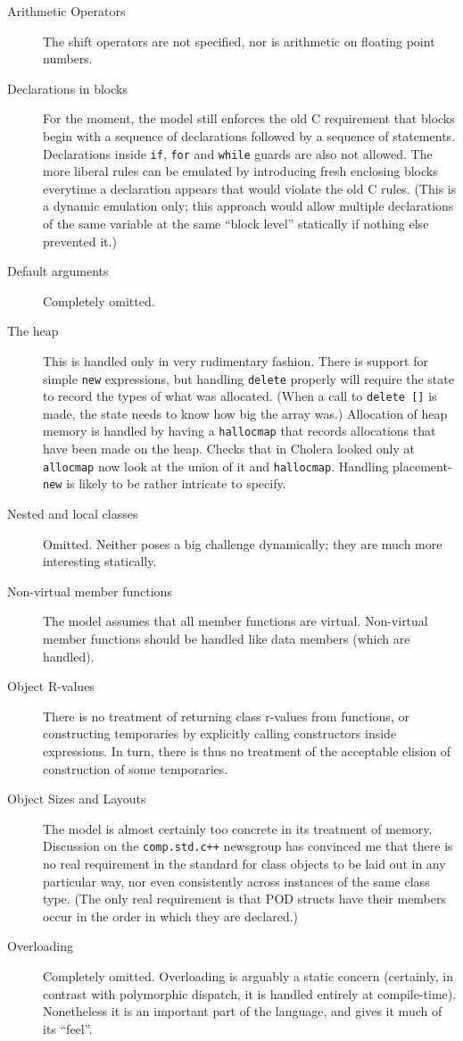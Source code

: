 \documentclass[11pt]{article}
\begin{document}
\begin{description}
\item[Arithmetic Operators]  The shift operators are not specified,
  nor is arithmetic on floating point numbers.
\item[Declarations in blocks] For the moment, the model still enforces
  the old C requirement that blocks begin with a sequence of
  declarations followed by a sequence of statements.  Declarations
  inside \texttt{if}, \texttt{for} and \texttt{while} guards are also
  not allowed.  The more liberal \cpp{} rules can be emulated by
  introducing fresh enclosing blocks everytime a declaration appears
  that would violate the old C rules.  (This is a dynamic emulation
  only; this approach would allow multiple declarations of the same
  variable at the same ``block level'' statically if nothing else
  prevented it.)
\item[Default arguments]  Completely omitted.
\item[The heap] This is handled only in very rudimentary fashion.
  There is support for simple \texttt{new} expressions, but handling
  \texttt{delete} properly will require the state to record the types
  of what was allocated.  (When a call to \texttt{delete []} is made,
  the state needs to know how big the array was.) Allocation of heap
  memory is handled by having a \texttt{hallocmap} that records
  allocations that have been made on the heap.  Checks that in
  \textsf{Cholera} looked only at \texttt{allocmap} now look at the
  union of it and \texttt{hallocmap}.  Handling placement-\texttt{new}
  is likely to be rather intricate to specify.
\item[Nested and local classes] Omitted.  Neither poses a big
  challenge dynamically; they are much more interesting statically.
\item[Non-virtual member functions] The model assumes that all member
  functions are virtual.  Non-virtual member functions should be
  handled like data members (which are handled).
\item[Object R-values] There is no treatment of returning class
  r-values from functions, or constructing temporaries by explicitly
  calling constructors inside expressions.  In turn, there is thus no
  treatment of the acceptable elision of construction of some
  temporaries.
\item[Object Sizes and Layouts] The model is almost certainly too
  concrete in its treatment of memory.  Discussion on the
  \texttt{comp.std.c++} newsgroup has convinced me that there is no
  real requirement in the standard for class objects to be laid out in
  any particular way, nor even consistently across instances of the
  same class type.  (The only real requirement is that POD structs
  have their members occur in the order in which they are declared.)
\item[Overloading] Completely omitted. Overloading is arguably a
  static concern (certainly, in contrast with polymorphic dispatch, it
  is handled entirely at compile-time).  Nonetheless it is an
  important part of the language, and gives it much of its ``feel''.
\end{description}
\end{document}
